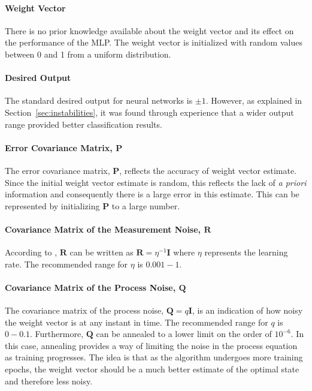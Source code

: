 \documentclass[11pt,letterpaper,titlepage]{article}
\numberwithin{equation}{section}
\numberwithin{figure}{section}
\numberwithin{table}{section}
\begin{document}
\paragraph{Weight Vector}
There is no prior knowledge available about the weight vector and its effect on the performance of the MLP. The weight vector is initialized with random values between 0 and 1 from a uniform distribution.

\paragraph{Desired Output}
The standard desired output for neural networks is \(\pm1\). However, as explained in Section~\ref{sec:instabilities}, it was found through experience that a wider output range provided better classification results.

\paragraph{Error Covariance Matrix, \(\mathbf{P}\) }
The error covariance matrix, \(\mathbf{P}\), reflects the accuracy of weight vector estimate. Since the initial weight vector estimate is random, this reflects the lack of \textit{a priori} information and consequently there is a large error in this estimate. This can be represented by initializing \(\mathbf{P}\) to a large number. 

\paragraph{Covariance Matrix of the Measurement Noise, \(\mathbf{R}\) }
According to \cite{Haykin2001}, \(\mathbf{R}\) can be written as \(\mathbf{R}=\eta^{-1} \mathbf{I}\) where \(\eta\) represents the learning rate. The recommended range for \(\eta\) is \(0.001 - 1\).

\paragraph{Covariance Matrix of the Process Noise, \(\mathbf{Q}\) }
The covariance matrix of the process noise, \(\mathbf{Q} = q\mathbf{I}\), is an indication of how noisy the weight vector is at any instant in time. The recommended range for \(q\) is \(0-0.1\). Furthermore, \(\mathbf{Q}\) can be annealed to a lower limit on the order of \(10^{-6}\). In this case, annealing provides a way of limiting the noise in the process equation as training progresses. The idea is that as the algorithm undergoes more training epochs, the weight vector should be a much better estimate of the optimal state and therefore less noisy. 
\end{document}
